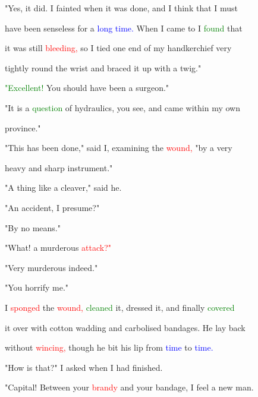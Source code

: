  "Yes, it did. I fainted when it was done, and I think that I must

 have been \textcolor{BurntOrange}{senseless} for a \textcolor{blue}{long} \textcolor{blue}{time.} When I came to I \textcolor{green}{found} that

 it was still \textcolor{red}{bleeding,} so I tied one end of my handkerchief very

 tightly round the wrist and braced it up with a twig."



 \textcolor{green}{"Excellent!} You should have been a surgeon."



 "It is a \textcolor{green}{question} of hydraulics, you see, and came within my own

 province."



 "This has been done," said I, examining the \textcolor{red}{wound,} "by a very

 heavy and sharp instrument."



 "A thing like a cleaver," said he.



 "An \textcolor{BurntOrange}{accident,} I presume?"



 "By no means."



 "What! a \textcolor{BurntOrange}{murderous} \textcolor{red}{attack?"}



 "Very \textcolor{BurntOrange}{murderous} indeed."



 "You horrify me."



 I \textcolor{red}{sponged} the \textcolor{red}{wound,} \textcolor{green}{cleaned} it, dressed it, and \textcolor{BurntOrange}{finally} \textcolor{green}{covered}

 it over with cotton wadding and carbolised bandages. He lay back

 without \textcolor{red}{wincing,} though he bit his lip from \textcolor{blue}{time} to \textcolor{blue}{time.}



 "How is that?" I asked when I had finished.



 "Capital! Between your \textcolor{red}{brandy} and your bandage, I feel a new man.

